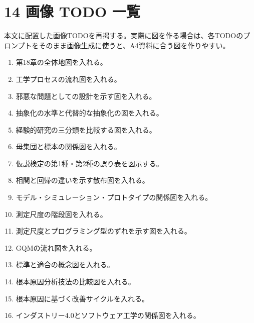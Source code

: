 \documentclass[uplatex,dvipdfmx,a4paper,11pt]{jsarticle}
\begin{document}
\section{14 画像 TODO 一覧}
本文に配置した画像TODOを再掲する。実際に図を作る場合は、各TODOのプロンプトをそのまま画像生成に使うと、A4資料に合う図を作りやすい。
\begin{enumerate}[leftmargin=2em]
\item 第18章の全体地図を入れる。
\item 工学プロセスの流れ図を入れる。
\item 邪悪な問題としての設計を示す図を入れる。
\item 抽象化の水準と代替的な抽象化の図を入れる。
\item 経験的研究の三分類を比較する図を入れる。
\item 母集団と標本の関係図を入れる。
\item 仮説検定の第1種・第2種の誤り表を図示する。
\item 相関と回帰の違いを示す散布図を入れる。
\item モデル・シミュレーション・プロトタイプの関係図を入れる。
\item 測定尺度の階段図を入れる。
\item 測定尺度とプログラミング型のずれを示す図を入れる。
\item GQMの流れ図を入れる。
\item 標準と適合の概念図を入れる。
\item 根本原因分析技法の比較図を入れる。
\item 根本原因に基づく改善サイクルを入れる。
\item インダストリー4.0とソフトウェア工学の関係図を入れる。
\end{enumerate}
\end{document}
